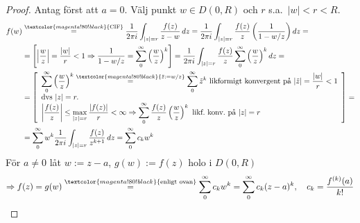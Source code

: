 \begin{proof}
Antag först att $a = 0$. Välj punkt $w \in D(0, R)$ och $r$ s.a.\ $|w| < r < R$.
\begin{align*}
f(w) &\overset{\textcolor{magenta!80!black}{\text{CIF}}}{=} \frac{1}{2\pi i}\int_{|z| = r} \frac{f(z)}{z - w}\,dz = \frac{1}{2\pi i}\int_{|z| = r} \frac{f(z)}{z}\left( \frac{1}{1 - w/z} \right) dz = \\
&= \left[ \left| \frac{w}{z} \right| = \frac{|w|}{r} < 1 \Rightarrow \frac{1}{1 - w/z} = \sum_0^\infty \left( \frac{w}{z} \right)^k \right] = \frac{1}{2\pi i}\int_{|z| = r} \frac{f(z)}{z}\sum_0^\infty \left( \frac{w}{z} \right)^k dz = \\
&= \left[ \begin{array}{l}
\displaystyle\sum_0^\infty \left( \frac{w}{z} \right)^k \overset{\textcolor{magenta!80!black}{\tilde{z} := w/z}}{=} \sum_0^\infty \tilde{z}^k \text{ likformigt konvergent på } |\tilde{z}| = \frac{|w|}{r} < 1 \\
\text{dvs } |z| = r. \\
\displaystyle\left| \frac{f(z)}{z} \right| \le \max_{|z| = r} \frac{|f(z)|}{r} < \infty \Rightarrow \sum_0^\infty \frac{f(z)}{z}\left( \frac{w}{z} \right)^k \text{ likf.\ konv.\ på } |z| = r
\end{array} \right] = \\
&= \sum_0^\infty w^k \frac{1}{2\pi i}\int_{|z| = r} \frac{f(z)}{z^{k + 1}}\,dz = \sum_0^\infty c_k w^k
\end{align*}
För $a \neq 0$ låt $w := z - a$, $g(w) := f(z)$ holo i $D(0, R)$
\[ \Rightarrow f(z) = g(w) \overset{\textcolor{magenta!80!black}{\text{enligt ovan}}}{=} \sum_0^\infty c_k w^k = \sum_0^\infty c_k(z - a)^k, \quad c_k = \frac{f^{(k)}(a)}{k!} \]
\end{proof}
